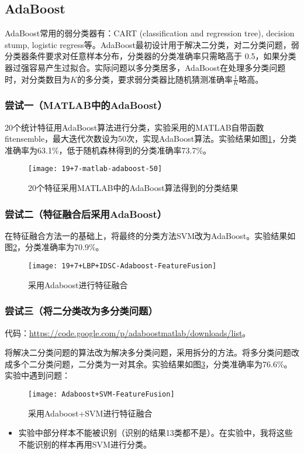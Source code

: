 \subsection{AdaBoost}
AdaBoost常用的弱分类器有：CART (classification and regression tree), decision stump, logistic regress等。AdaBoost最初设计用于解决二分类，对二分类问题，弱分类器条件要求对任意样本分布，分类器的分类准确率只需略高于 0.5，如果分类器过强容易产生过拟合。实际问题以多分类居多，AdaBoost在处理多分类问题时，对分类数目为$K$的多分类，要求弱分类器比随机猜测准确率$\frac{1}{K}$略高。

\subsubsection{尝试一（MATLAB中的AdaBoost）}
20个统计特征用AdaBoost算法进行分类，实验采用的MATLAB自带函数fitensemble，最大迭代次数设为50次，实现AdaBoost算法。实验结果如图\ref{fig:19+7-matlab-adaboost-50}，分类准确率为63.1\%，低于随机森林得到的分类准确率73.7\%。
\begin{figure}[!ht]
\centering
\texttt{[image: 19+7-matlab-adaboost-50]}
\caption{20个特征采用MATLAB中的AdaBoost算法得到的分类结果}
\label{fig:19+7-matlab-adaboost-50}
\end{figure}

\subsubsection{尝试二（特征融合后采用AdaBoost）}
在特征融合方法一的基础上，将最终的分类方法SVM改为AdaBoost。实验结果如图\ref{fig:19+7+LBP+IDSC-Adaboost-FeatureFusion}，分类准确率为70.9\%。
\begin{figure}[!ht]
\centering
\texttt{[image: 19+7+LBP+IDSC-Adaboost-FeatureFusion]}
\caption{采用Adaboost进行特征融合}
\label{fig:19+7+LBP+IDSC-Adaboost-FeatureFusion}
\end{figure}

\subsubsection{尝试三（将二分类改为多分类问题）}
代码：\url{https://code.google.com/p/adaboostmatlab/downloads/list}。

将解决二分类问题的算法改为解决多分类问题，采用拆分的方法。将多分类问题改成多个二分类问题，二分类为一对其余。实验结果如图\ref{fig:Adaboost+SVM-FeatureFusion}，分类准确率为76.6\%。实验中遇到问题：
\begin{figure}[!ht]
\centering
\texttt{[image: Adaboost+SVM-FeatureFusion]}
\caption{采用Adaboost+SVM进行特征融合}
\label{fig:Adaboost+SVM-FeatureFusion}
\end{figure}
\begin{itemize}
\item 实验中部分样本不能被识别（识别的结果13类都不是）。在实验中，我将这些不能识别的样本再用SVM进行分类。
\end{itemize}

